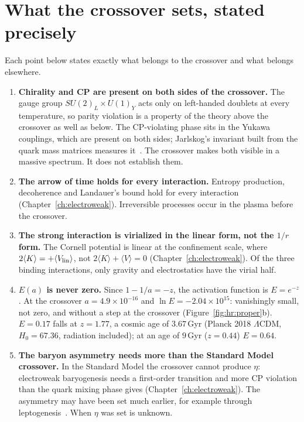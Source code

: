 \section{What the crossover sets, stated precisely}\label{sec:hr:corrections}
Each point below states exactly what belongs to the crossover and what belongs elsewhere.
\begin{enumerate}
\item \textbf{Chirality and CP are present on both sides of the crossover.} The gauge group $SU(2)_L\times U(1)_Y$ acts only on left-handed doublets at every
temperature, so parity violation is a property of the theory above the crossover as well as below. The CP-violating phase sits in the Yukawa
couplings, which are present on both sides; Jarlskog's invariant built from the quark mass matrices measures it~\cite{Jarlskog1985}. \observed{}
The crossover makes both visible in a massive spectrum. It does not establish them.
\item \textbf{The arrow of time holds for every interaction.} Entropy production, decoherence and Landauer's bound hold for every interaction
(Chapter~\ref{ch:electroweak}). Irreversible processes occur in the plasma before the crossover. \derived
\item \textbf{The strong interaction is virialized in the linear form, not the $1/r$ form.} The Cornell potential is linear at the confinement scale, where
$2\langle K\rangle=+\langle V_{\rm lin}\rangle$, not $2\langle K\rangle+\langle V\rangle=0$ (Chapter~\ref{ch:electroweak}). Of the three binding
interactions, only gravity and electrostatics have the virial half. \derived
\item \textbf{$E(a)$ is never zero.} Since $1-1/a=-z$, the activation function is $E=e^{-z}$. At the crossover $a=4.9\times10^{-16}$ and
$\ln E=-2.04\times10^{15}$: vanishingly small, not zero, and without a step at the crossover (Figure~\ref{fig:hr:proper}b). \calc{} $E=0.17$ falls
at $z=1.77$, a cosmic age of $3.67$\,Gyr (Planck 2018 $\Lambda$CDM, $H_0=67.36$, radiation included); at an age of $9$\,Gyr ($z=0.44$) $E=0.64$. \calc
\item \textbf{The baryon asymmetry needs more than the Standard Model crossover.} In the Standard Model the crossover cannot produce $\eta$: electroweak baryogenesis
needs a first-order transition and more CP violation than the quark mixing phase gives (Chapter~\ref{ch:electroweak}). The asymmetry may have
been set much earlier, for example through leptogenesis~\cite{FukugitaYanagida1986}. When $\eta$ was set is unknown. \observed

\end{enumerate}
